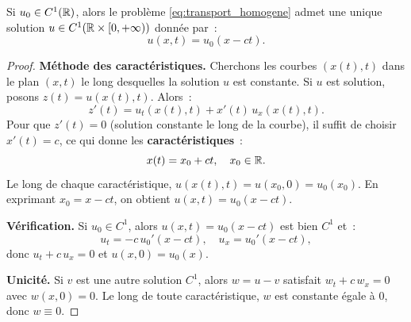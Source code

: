 \begin{theoreme}
Si $u_0 \in C^1(\mathbb{R})$, alors le probl\`eme \eqref{eq:transport_homogene}
admet une unique solution $u \in C^1(\mathbb{R} \times [0,+\infty))$ donn\'ee par~:
\begin{equation}\label{eq:transport_solution}
    \boxed{u(x,t) = u_0(x - ct).}
\end{equation}
\end{theoreme}

\begin{proof}
\textbf{M\'ethode des caract\'eristiques.} Cherchons les courbes
$(x(t), t)$ dans le plan $(x,t)$ le long desquelles la solution $u$
est constante. Si $u$ est solution, posons $z(t) = u(x(t), t)$. Alors~:
\[
    z'(t) = u_t(x(t),t) + x'(t)\, u_x(x(t),t).
\]
Pour que $z'(t) = 0$ (solution constante le long de la courbe), il suffit
de choisir $x'(t) = c$, ce qui donne les \textbf{caract\'eristiques}~:
\[
    x(t) = x_0 + ct, \quad x_0 \in \mathbb{R}.
\]
Le long de chaque caract\'eristique, $u(x(t),t) = u(x_0, 0) = u_0(x_0)$.
En exprimant $x_0 = x - ct$, on obtient $u(x,t) = u_0(x-ct)$.

\textbf{V\'erification.} Si $u_0 \in C^1$, alors $u(x,t) = u_0(x-ct)$
est bien $C^1$ et~:
\[
    u_t = -c\, u_0'(x-ct), \quad u_x = u_0'(x-ct),
\]
donc $u_t + c\, u_x = 0$ et $u(x,0) = u_0(x)$.

\textbf{Unicit\'e.} Si $v$ est une autre solution $C^1$, alors
$w = u - v$ satisfait $w_t + c\, w_x = 0$ avec $w(x,0) = 0$. Le long
de toute caract\'eristique, $w$ est constante \'egale \`a $0$, donc $w \equiv 0$.
\end{proof}

\begin{center}
\end{center}

